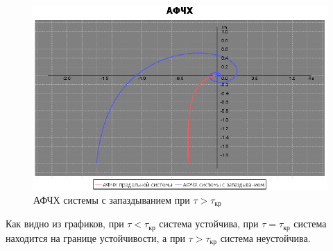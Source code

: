 \documentclass[12pt]{article}
\begin{document}
\begin{figure}[h!]
     \centering
    \includegraphics[width = \linewidth]{tau больше tau крит.png}
    \caption{АФЧХ системы с запаздыванием при $\tau > \tau_{кр}$}
\end{figure} 
\newpage
Как видно из графиков, при $\tau < \tau_{кр}$ система устойчива, при $\tau = \tau_{кр}$ система находится на границе устойчивости, а при $\tau > \tau_{кр}$ система неустойчива.
\newpage
\end{document}
